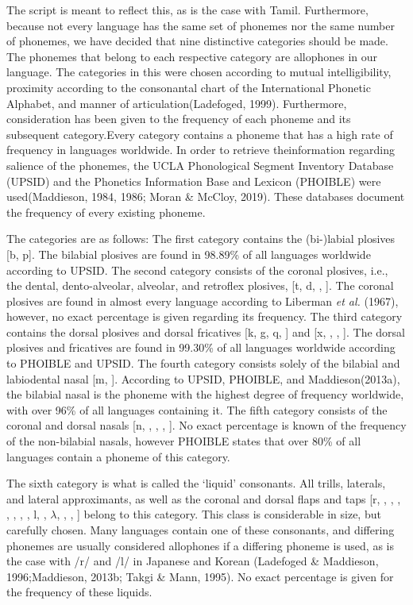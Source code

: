 The script is meant to reflect this, as is the case with Tamil. Furthermore, because not every language has the same set of phonemes nor the same number of phonemes, we have decided that nine distinctive categories should be made. The phonemes that belong to each respective category are allophones in our language. The categories in this were chosen according to mutual intelligibility, proximity according to the consonantal chart of the International Phonetic Alphabet, and manner of articulation(Ladefoged, 1999). Furthermore, consideration has been given to the frequency of each phoneme and its subsequent category.Every category contains a phoneme that has a high rate of frequency in languages worldwide. In order to retrieve theinformation regarding salience of the phonemes, the UCLA Phonological Segment Inventory Database (UPSID) and the Phonetics Information Base and Lexicon (PHOIBLE) were used(Maddieson, 1984, 1986; Moran \& McCloy, 2019). These databases document the frequency of every existing phoneme. 

The categories are as follows: The first category contains the (bi-)labial plosives [b, p]. The bilabial plosives are found  in 98.89\% of all languages worldwide according to UPSID. The second category consists of the coronal plosives, i.e., the dental, dento-alveolar, alveolar, and retroflex plosives, [t, d, \textrtailt, \textrtaild]. The coronal plosives are found  in almost every language according to Liberman \textit{et al.} (1967), however, no exact percentage is given regarding its frequency. The third category contains the dorsal plosives and dorsal fricatives [k, g, q, \textscg] and [x, \textgamma, \textchi, \textinvscr]. The dorsal plosives and fricatives are found  in 99.30\% of all languages worldwide according to PHOIBLE and UPSID. The fourth category consists solely of the bilabial and labiodental nasal [m, \textltailm]. According to UPSID, PHOIBLE, and Maddieson(2013a), the bilabial nasal is the phoneme with the highest degree of frequency worldwide, with over 96\% of all languages containing it. The fifth category consists of the coronal and dorsal nasals [n, \textrtailn ,  \textltailn, \ng, \textscn]. No exact percentage is known of the frequency of the non-bilabial nasals, however PHOIBLE states that over 80\% of all languages contain a phoneme of this category. 

The sixth category is what is called the ‘liquid’ consonants. All trills, laterals, and lateral approximants, as well as the coronal and dorsal flaps and taps [r, \textscr , \textfishhookr, \textrtailr, \textbeltl, \textlyoghlig, \textturnr, \textturnrrtail, l, \textrtaill, $\lambda$, \textscl, \textturnmrleg,  \textturnlonglegr] belong to this category. This class is considerable in size, but carefully chosen. Many languages contain one of these consonants, and differing phonemes are usually considered allophones if a differing phoneme is used, as is the case with /r/ and /l/ in Japanese and Korean (Ladefoged \& Maddieson, 1996;Maddieson, 2013b; Takgi \& Mann, 1995). No exact percentage is given for the frequency of these liquids. 

